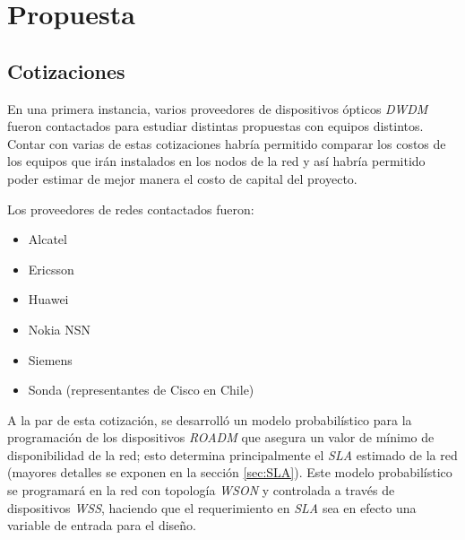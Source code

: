 \section{Propuesta}
\label{sec:propuesta}

\subsection{Cotizaciones}
\label{sec:disenos}

En una primera instancia, varios proveedores de dispositivos ópticos
\emph{DWDM} fueron contactados para estudiar distintas propuestas con
equipos distintos. Contar con varias de estas cotizaciones habría
permitido comparar los costos de los equipos que irán instalados en
los nodos de la red y así habría permitido poder estimar de mejor
manera el costo de capital del proyecto.

Los proveedores de redes contactados fueron:
\begin{itemize}
\item Alcatel
\item Ericsson
\item Huawei
\item Nokia NSN
\item Siemens
\item Sonda (representantes de Cisco en Chile)
\end{itemize}

A la par de esta cotización, se desarrolló un modelo probabilístico
para la programación de los dispositivos \emph{ROADM} que asegura un
valor de mínimo de disponibilidad de la red; esto determina
principalmente el \emph{SLA} estimado de la red (mayores detalles se
exponen en la sección \ref{sec:SLA}). Este modelo probabilístico se
programará en la red con topología \emph{WSON} y controlada a través
de dispositivos \emph{WSS}, haciendo que el requerimiento en
\emph{SLA} sea en efecto una variable de entrada para el diseño.




